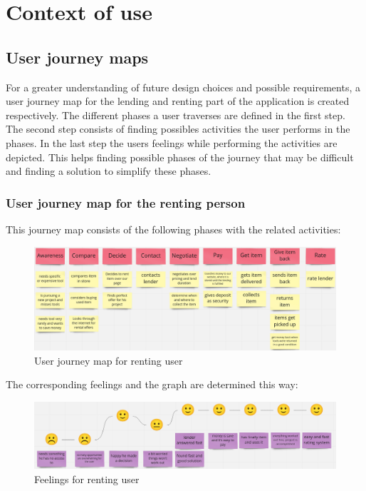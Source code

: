 \section{Context of use}
	\subsection{User journey maps}
		For a greater understanding of future design choices and possible requirements, a user journey map for the lending and renting part of the application is created respectively. The different phases a user traverses are defined in the first step. The second step consists of finding possibles activities the user performs in the phases. In the last step the users feelings while performing the activities are depicted. This helps finding possible phases of the journey that may be difficult and finding a solution to simplify these phases.\\
		
		\subsubsection{User journey map for the renting person}
			This journey map consists of the following phases with the related activities:
			
			\begin{figure}[H]
				\centering
				\includegraphics[width=\linewidth]{abb/2_context_of_use/user_journey_map_renting.png}
				\caption{User journey map for renting user}
				\label{fig:ujm_renting}
			\end{figure}
			
			\noindent
			The corresponding feelings and the graph are determined this way:
			
			\begin{figure}[H]
				\centering
				\includegraphics[width=\linewidth]{abb/2_context_of_use/feelings_renting.png}
				\caption{Feelings for renting user}
				\label{fig:ujm_renting_feelings}
			\end{figure}
		
